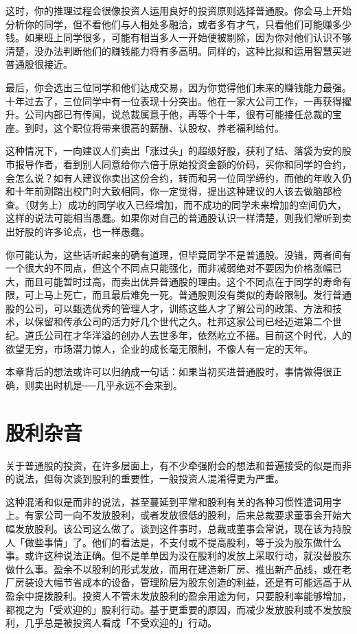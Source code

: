 \documentclass[UTF8,a4paper,zihao=-4,fontset = windows]{ctexart} %
\begin{document}
这时，你的推理过程会很像投资人运用良好的投资原则选择普通股。你会马上开始分析你的同学，但不看他们与人相处多融洽，或者多有才气，只看他们可能赚多少钱。如果班上同学很多，可能有相当多人一开始便被剔除，因为你对他们认识不够清楚，没办法判断他们的赚钱能力将有多高明。同样的，这种比拟和运用智慧买进普通股很接近。

最后，你会选出三位同学和他们达成交易，因为你觉得他们未来的赚钱能力最强。十年过去了，三位同学中有一位表现十分突出。他在一家大公司工作，一再获得擢升。公司内部已有传闻，说总裁属意于他，再等个十年，很有可能接任总裁的宝座。到时，这个职位将带来很高的薪酬、认股权、养老福利给付。

这种情况下，一向建议人们卖出「涨过头」的超级好股，获利了结、落袋为安的股市报导作者，看到别人同意给你六倍于原始投资金额的价码，买你和同学的合约，会怎么说？如有人建议你卖出这份合约，转而和另一位同学缔约，而他的年收入仍和十年前刚踏出校门时大致相同，你一定觉得，提出这种建议的人该去做脑部检查。（财务上）成功的同学收入已经增加，而不成功的同学未来增加的空间仍大，这样的说法可能相当愚蠢。如果你对自己的普通股认识一样清楚，则我们常听到卖出好股的许多论点，也一样愚蠢。

你可能认为，这些话听起来的确有道理，但毕竟同学不是普通股。没错，两者间有一个很大的不同点，但这个不同点只能强化，而非减弱绝对不要因为价格涨幅已大，而且可能暂时过高，而卖出优异普通股的理由。这个不同点在于同学的寿命有限，可上马上死亡，而且最后难免一死。普通股则没有类似的寿龄限制。发行普通股的公司，可以甄选优秀的管理人才，训练这些人才了解公司的政策、方法和技术，以保留和传承公司的活力好几个世代之久。杜邦这家公司已经迈进第二个世纪。道氏公司在才华洋溢的创办人去世多年，依然屹立不摇。目前这个时代，人的欲望无穷，市场潜力惊人，企业的成长毫无限制，不像人有一定的天年。

本章背后的想法或许可以归纳成一句话：如果当初买进普通股时，事情做得很正确，则卖出时机是──几乎永远不会来到。

\section{股利杂音}

关于普通股的投资，在许多层面上，有不少牵强附会的想法和普遍接受的似是而非的说法，但每次谈到股利的重要性，一般投资人混淆得更为严重。

这种混淆和似是而非的说法，甚至蔓延到平常和股利有关的各种习惯性遣词用字上。有家公司一向不发放股利，或者发放很低的股利，后来总裁要求董事会开始大幅发放股利。该公司这么做了。谈到这件事时，总裁或董事会常说，现在该为持股人「做些事情」了。他们的看法是，不支付或不提高股利，等于没为股东做什么事。或许这种说法正确。但不是单单因为没在股利的发放上采取行动，就没替股东做什么事。盈余不以股利的形式发放，而用在建造新厂房、推出新产品线，或在老厂房装设大幅节省成本的设备，管理阶层为股东创造的利益，还是有可能远高于从盈余中提拨股利。投资人不管未发放股利的盈余用途为何，只要股利率能够增加，都视之为「受欢迎的」股利行动。基于更重要的原因，而减少发放股利或不发放股利，几乎总是被投资人看成「不受欢迎的」行动。
\end{document}
